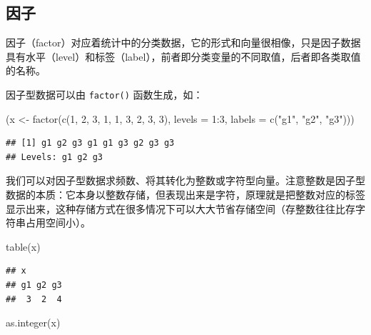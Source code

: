 \documentclass[
  b5paper,
  UTF8,twoside]{book}
\newenvironment{Shaded}{\begin{snugshade}}{\end{snugshade}}
\newcommand{\AttributeTok}[1]{\textcolor[rgb]{0.77,0.63,0.00}{#1}}
\newcommand{\DecValTok}[1]{\textcolor[rgb]{0.00,0.00,0.81}{#1}}
\newcommand{\FunctionTok}[1]{\textcolor[rgb]{0.00,0.00,0.00}{#1}}
\newcommand{\NormalTok}[1]{#1}
\newcommand{\OtherTok}[1]{\textcolor[rgb]{0.56,0.35,0.01}{#1}}
\newcommand{\SpecialCharTok}[1]{\textcolor[rgb]{0.00,0.00,0.00}{#1}}
\newcommand{\StringTok}[1]{\textcolor[rgb]{0.31,0.60,0.02}{#1}}
\begin{document}
\hypertarget{ux56e0ux5b50}{%
\subsection{因子}\label{ux56e0ux5b50}}

因子（factor）对应着统计中的分类数据，它的形式和向量很相像，只是因子数据具有水平（level）和标签（label），前者即分类变量的不同取值，后者即各类取值的名称。

因子型数据可以由 \texttt{factor()} 函数生成，如：

\begin{Shaded}
\begin{Highlighting}[]
\NormalTok{(x }\OtherTok{\textless{}{-}} \FunctionTok{factor}\NormalTok{(}\FunctionTok{c}\NormalTok{(}\DecValTok{1}\NormalTok{, }\DecValTok{2}\NormalTok{, }\DecValTok{3}\NormalTok{, }\DecValTok{1}\NormalTok{, }\DecValTok{1}\NormalTok{, }\DecValTok{3}\NormalTok{, }\DecValTok{2}\NormalTok{, }\DecValTok{3}\NormalTok{, }\DecValTok{3}\NormalTok{), }\AttributeTok{levels =} \DecValTok{1}\SpecialCharTok{:}\DecValTok{3}\NormalTok{, }\AttributeTok{labels =} \FunctionTok{c}\NormalTok{(}\StringTok{"g1"}\NormalTok{, }\StringTok{"g2"}\NormalTok{, }\StringTok{"g3"}\NormalTok{)))}
\end{Highlighting}
\end{Shaded}

\begin{verbatim}
## [1] g1 g2 g3 g1 g1 g3 g2 g3 g3
## Levels: g1 g2 g3
\end{verbatim}

我们可以对因子型数据求频数、将其转化为整数或字符型向量。注意整数是因子型数据的本质：它本身以整数存储，但表现出来是字符，原理就是把整数对应的标签显示出来，这种存储方式在很多情况下可以大大节省存储空间（存整数往往比存字符串占用空间小）。

\begin{Shaded}
\begin{Highlighting}[]
\FunctionTok{table}\NormalTok{(x)}
\end{Highlighting}
\end{Shaded}

\begin{verbatim}
## x
## g1 g2 g3 
##  3  2  4
\end{verbatim}

\begin{Shaded}
\begin{Highlighting}[]
\FunctionTok{as.integer}\NormalTok{(x)}
\end{Highlighting}
\end{Shaded}
\end{document}
